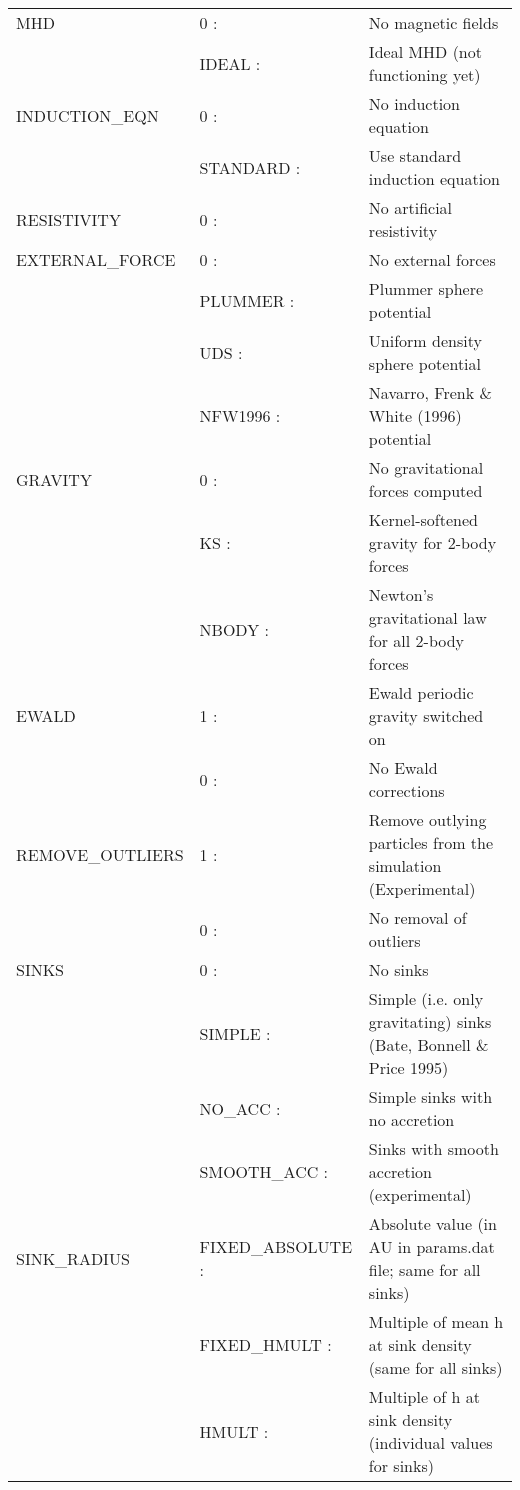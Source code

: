 \documentclass[a4paper]{article}
\begin{document}
\begin{center}
\begin{supertabular}{|p{4.6cm}|p{4.6cm} p{6.4cm}|}
 MHD           & 0     :& No magnetic fields \\
               & IDEAL :& Ideal MHD (not functioning yet) \\ \hline

 INDUCTION\_EQN & 0        :& No induction equation \\
                & STANDARD :& Use standard induction equation \\ \hline

 RESISTIVITY   & 0  :& No artificial resistivity \\ \hline

 EXTERNAL\_FORCE & 0       :& No external forces \\
                 & PLUMMER :& Plummer sphere potential \\
                 & UDS     :& Uniform density sphere potential \\
                 & NFW1996 :& Navarro, Frenk \& White (1996) potential \\ \hline

 GRAVITY       & 0  :& No gravitational forces computed \\
	       & KS :& Kernel-softened gravity for 2-body forces \\
	       & NBODY :& Newton's gravitational law for all 2-body forces 
\\ \hline

 EWALD         & 1 :& Ewald periodic gravity switched on \\
               & 0 :& No Ewald corrections \\ \hline

 REMOVE\_OUTLIERS & 1 :& Remove outlying particles from the simulation (Experimental) \\
                  & 0 :& No removal of outliers \\ \hline

 SINKS         & 0  :& No sinks \\
               & SIMPLE :& Simple (i.e. only gravitating) sinks (Bate, Bonnell \& Price 1995)\\ 
               & NO\_ACC :& Simple sinks with no accretion \\
               & SMOOTH\_ACC :& Sinks with smooth accretion (experimental) \\ \hline

 SINK\_RADIUS  & FIXED\_ABSOLUTE :& Absolute value (in AU in params.dat file; same for all sinks) \\ 
               & FIXED\_HMULT    :& Multiple of mean h at sink density (same for all sinks) \\
               & HMULT           :& Multiple of h at sink density (individual values for sinks) \\ \hline


\end{supertabular}
\end{center}
\end{document}
